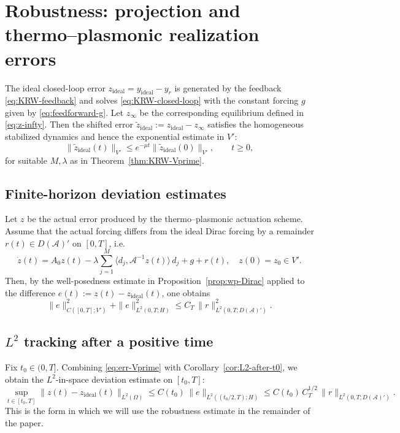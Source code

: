 \documentclass[11pt,a4paper]{article}
\numberwithin{equation}{section}
\theoremstyle{definition}
\newcommand{\1}{\mathbbm{1}}
\begin{document}
\section{Robustness: projection and thermo--plasmonic realization errors}
\label{sec:robust-Vprime}
\noindent
The ideal closed-loop error $z_{\mathrm{ideal}}=y_{\mathrm{ideal}}-y_r$ is generated by the feedback
\eqref{eq:KRW-feedback} and solves \eqref{eq:KRW-closed-loop} with the constant forcing $g$ given by
\eqref{eq:feedforward-g}. Let $z_\infty$ be the corresponding equilibrium defined in \eqref{eq:z-infty}.
Then the shifted error $\tilde z_{\mathrm{ideal}}:=z_{\mathrm{ideal}}-z_\infty$ satisfies the homogeneous
stabilized dynamics and hence the exponential estimate in $V'$:
\[
\|\tilde z_{\mathrm{ideal}}(t)\|_{V'} \le e^{-\mu t}\|\tilde z_{\mathrm{ideal}}(0)\|_{V'},\qquad t\ge 0,
\]
for suitable $M,\lambda$ as in Theorem~\ref{thm:KRW-Vprime}.

\subsection{Finite-horizon deviation estimates}
\noindent
Let $z$ be the actual error produced by the thermo--plasmonic actuation scheme.
Assume that the actual forcing differs from the ideal Dirac forcing by a remainder
$r(t)\in D(\mathcal A)'$ on $[0,T]$, i.e.
\[
\dot z(t)=A_0 z(t) -\lambda\sum_{j=1}^M \langle d_j,\mathcal A^{-1}z(t)\rangle\, d_j + g + r(t),
\quad z(0)=z_0\in V'.
\]
Then, by the well-posedness estimate in Proposition~\ref{prop:wp-Dirac} applied to the difference
$e(t):=z(t)-z_{\mathrm{ideal}}(t)$, one obtains
\begin{equation}
\label{eq:err-Vprime}
\|e\|_{C([0,T];V')}^2 + \|e\|_{L^2(0,T;H)}^2
\le C_T\,\|r\|_{L^2(0,T;D(\mathcal A)')}^2.
\end{equation}

\subsection{$L^2$ tracking after a positive time}
\noindent
Fix $t_0\in(0,T]$. Combining \eqref{eq:err-Vprime} with Corollary~\ref{cor:L2-after-t0},
we obtain the $L^2$-in-space deviation estimate on $[t_0,T]$:
\[
\sup_{t\in[t_0,T]}\|z(t)-z_{\mathrm{ideal}}(t)\|_{L^2(\Omega)}
\le C(t_0)\,\|e\|_{L^2((t_0/2,T);H)}
\le C(t_0)\,C_T^{1/2}\,\|r\|_{L^2(0,T;D(\mathcal A)')}.
\]
This is the form in which we will use the robustness estimate in the remainder of the paper.
\end{document}
